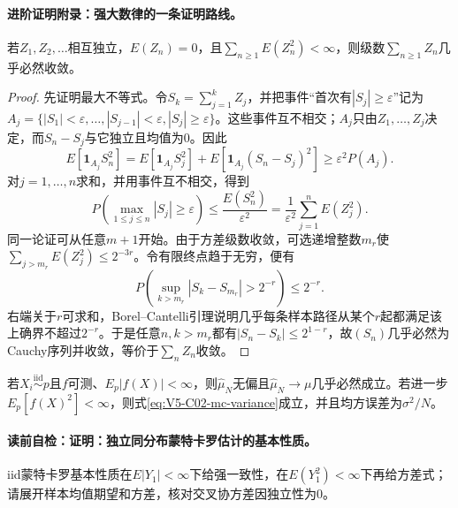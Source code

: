 \paragraph{进阶证明附录：强大数律的一条证明路线。}
\begin{lemma}[Kolmogorov独立级数收敛准则]\label{lem:V5-C02-kolmogorov-series}
若$Z_1,Z_2,\ldots$相互独立，$E(Z_n)=0$，且$\sum_{n\ge1}E(Z_n^2)<\infty$，则级数$\sum_{n\ge1}Z_n$几乎必然收敛。
\end{lemma}
\begin{proof}
先证明最大不等式。令$S_k=\sum_{j=1}^kZ_j$，并把事件“首次有$|S_j|\ge\varepsilon$”记为
$A_j=\{|S_1|<\varepsilon,\ldots,|S_{j-1}|<\varepsilon,|S_j|\ge\varepsilon\}$。这些事件互不相交；$A_j$只由$Z_1,\ldots,Z_j$决定，而$S_n-S_j$与它独立且均值为$0$。因此
\[
E[\boldsymbol1_{A_j}S_n^2]
=E[\boldsymbol1_{A_j}S_j^2]+E[\boldsymbol1_{A_j}(S_n-S_j)^2]
\ge\varepsilon^2P(A_j).
\]
对$j=1,\ldots,n$求和，并用事件互不相交，得到
\[
P\!\left(\max_{1\le j\le n}|S_j|\ge\varepsilon\right)
\le\frac{E(S_n^2)}{\varepsilon^2}
=\frac1{\varepsilon^2}\sum_{j=1}^nE(Z_j^2).
\]
同一论证可从任意$m+1$开始。由于方差级数收敛，可选递增整数$m_r$使$\sum_{j>m_r}E(Z_j^2)\le2^{-3r}$。令有限终点趋于无穷，便有
\[
P\!\left(\sup_{k>m_r}|S_k-S_{m_r}|>2^{-r}\right)\le2^{-r}.
\]
右端关于$r$可求和，Borel--Cantelli引理说明几乎每条样本路径从某个$r$起都满足该上确界不超过$2^{-r}$。于是任意$n,k>m_r$都有$|S_n-S_k|\le2^{1-r}$，故$(S_n)$几乎必然为Cauchy序列并收敛，等价于$\sum_nZ_n$收敛。
\end{proof}

\begin{theorem}[独立同分布蒙特卡罗估计的基本性质]\label{thm:V5-C02-iid-mc}
若$X_i\stackrel{\mathrm{iid}}{\sim}p$且$f$可测、$E_p|f(X)|<\infty$，则$\widehat\mu_N$无偏且$\widehat\mu_N\to\mu$几乎必然成立。若进一步$E_p[f(X)^2]<\infty$，则式\eqref{eq:V5-C02-mc-variance}成立，并且均方误差为$\sigma^2/N$。
\end{theorem}
\label{struct:V5-C02-CH13}
\paragraph{读前自检：证明：独立同分布蒙特卡罗估计的基本性质。}iid蒙特卡罗基本性质在$E|Y_1|<\infty$下给强一致性，在$E(Y_1^2)<\infty$下再给方差式；请展开样本均值期望和方差，核对交叉协方差因独立性为0。\par

